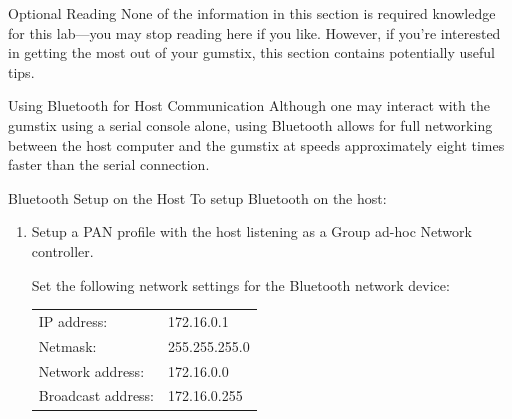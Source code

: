 \documentclass{article}
\begin{document}
	\begin{section}{Optional Reading}
		None of the information in this section is required knowledge for this
		lab---you may stop reading here if you like.  However, if you're interested
		in getting the most out of your gumstix, this section contains potentially
		useful tips.

		\begin{subsection}{Using Bluetooth for Host Communication}
			Although one may interact with the gumstix using a serial console alone,
			using Bluetooth allows for full networking between the host computer and
			the gumstix at speeds approximately eight times faster than the serial
			connection.

			\begin{subsubsection}{Bluetooth Setup on the Host}
				To setup Bluetooth on the host:
				\begin{enumerate}
					\item Setup a PAN profile with the host listening as a Group ad-hoc Network
					      controller.

					\begin{item}
						Set the following network settings for the Bluetooth network device:
						\begin{center}
							\begin{tabular}{|ll|}
								\hline %
								IP address:        & 172.16.0.1    \\
								Netmask:           & 255.255.255.0 \\
								Network address:   & 172.16.0.0    \\
								Broadcast address: & 172.16.0.255  \\
								\hline %
							\end{tabular}
						\end{center}
					\end{item}
				\end{enumerate}
			\end{subsubsection}


\end{subsection}
\end{section}
\end{document}
